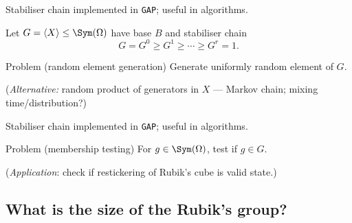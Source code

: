 \begin{slide}
    Stabiliser chain implemented in \texttt{GAP}; useful in algorithms. \pause

    Let $G = \langle X \rangle \leq \Sym(\Omega)$ have base $B$ and stabiliser chain
    $$G = G^0 \geq G^1 \geq \dotsb \geq G^r = 1.$$ \pause

    \begin{alertblock}{Problem (random element generation)}
        \vspace{0pt}
        Generate uniformly random element of $G$.

        (\textit{Alternative:} \pause random product of generators in $X$ --- Markov chain; mixing time/distribution?)
    \end{alertblock}
\end{slide}

\begin{slide}
    Stabiliser chain implemented in \texttt{GAP}; useful in algorithms.

    \begin{alertblock}{Problem (membership testing)}
        \vspace{0pt}
        For $g \in \Sym(\Omega)$, test if $g \in G$.

        (\textit{Application}: \pause check if restickering of Rubik's cube is valid state.)
    \end{alertblock}

    \begin{center}
    \end{center}
\end{slide}

\subsection{What is the size of the Rubik's group?}

